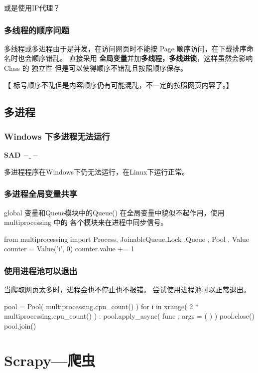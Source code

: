 \documentclass{article}
\begin{document}
      或是使用IP代理？

       \subsubsection{多线程的顺序问题}
        多线程或多进程由于是并发，在访问网页时不能按 Page 顺序访问，在下载排序命名时也会顺序错乱。 直接采用 \textbf{全局变量}并加\textbf{多线程，多线进锁}，这样虽然会影响 Class 的 独立性 但是可以使得顺序不错乱且按照顺序保存。

       【 标号顺序不乱但是内容顺序仍有可能混乱，不一定的按照网页内容了。】

     \subsection{多进程}
          \subsubsection{Windows 下多进程无法运行}
              \textbf{SAD $-\_-$}

              多进程程序在Windows下仍无法运行，在Linux下运行正常。
          \subsubsection{多进程全局变量共享}
              global 变量和Queue模块中的Queue() 在全局变量中貌似不起作用，使用 multiprocessing 中的 各个模块来在进程中同步信号。
                \begin{python}
from multiprocessing import Process, JoinableQueue,Lock ,Queue , Pool , Value
counter = Value('i', 0)
counter.value += 1  
                \end{python}

            \subsubsection{使用进程池可以退出}
                当爬取网页太多时，进程会也不停止也不报错。 尝试使用进程池可以正常退出。
                \begin{python}
pool  = Pool( multiprocessing.cpu_count() )
for i in xrange( 2 * multiprocessing.cpu_count() ) :
        pool.apply_async( func , args = ( ) )
pool.close()  
pool.join() 
                \end{python}


    \section*{\Large Scrapy---爬虫}
\end{document}
